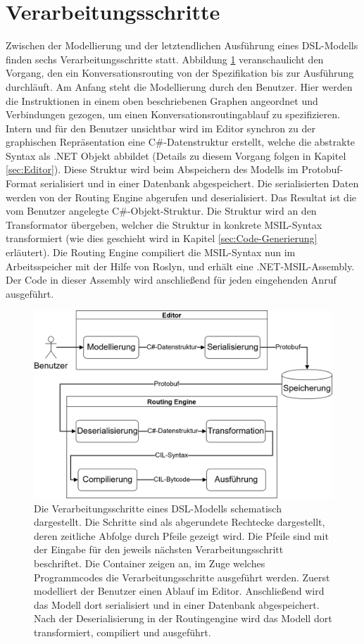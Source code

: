 \section{Verarbeitungsschritte}
\label{sec:Verarbeitungsschritte}
Zwischen der Modellierung und der letztendlichen Ausführung eines DSL-Modells finden sechs Verarbeitungsschritte statt. Abbildung \ref{fig:Verarbeitungsschritte} veranschaulicht den Vorgang, den ein Konversationsrouting von der Spezifikation bis zur Ausführung durchläuft. Am Anfang steht die Modellierung durch den Benutzer. Hier werden die Instruktionen in einem oben beschriebenen Graphen angeordnet und Verbindungen gezogen, um einen Konversationsroutingablauf zu spezifizieren. Intern und für den Benutzer unsichtbar wird im Editor synchron zu der graphischen Repräsentation eine C\#-Datenstruktur erstellt, welche die abstrakte Syntax als .NET Objekt abbildet (Details zu diesem Vorgang folgen in Kapitel \ref{sec:Editor}). Diese Struktur wird beim Abspeichern des Modells im Protobuf-Format serialisiert und in einer Datenbank abgespeichert. Die serialisierten Daten werden von der Routing Engine abgerufen und deserialisiert. Das Resultat ist die vom Benutzer angelegte C\#-Objekt-Struktur. Die Struktur wird an den Transformator übergeben, welcher die Struktur in konkrete MSIL-Syntax transformiert (wie dies geschieht wird in Kapitel \ref{sec:Code-Generierung} erläutert). Die Routing Engine compiliert die MSIL-Syntax nun im Arbeitsspeicher mit der Hilfe von Roslyn, und erhält eine .NET-MSIL-Assembly. Der Code in dieser Assembly wird anschließend für jeden eingehenden Anruf ausgeführt. 

\begin{figure} %
	\centering
		\includegraphics[width=\textwidth]{img/Verarbeitungsschritte.png}
	\caption[Verarbeitungsschritte eines DSL-Modells]{Die Verarbeitungsschritte eines DSL-Modells schematisch dargestellt. Die Schritte sind als abgerundete Rechtecke dargestellt, deren zeitliche Abfolge durch Pfeile gezeigt wird. Die Pfeile sind mit der Eingabe für den jeweils nächsten Verarbeitungsschritt beschriftet. Die Container zeigen an, im Zuge welches Programmcodes die Verarbeitungsschritte ausgeführt werden. Zuerst modelliert der Benutzer einen Ablauf im Editor. Anschließend wird das Modell dort serialisiert und in einer Datenbank abgespeichert. Nach der Deserialisierung in der Routingengine wird das Modell dort transformiert, compiliert und ausgeführt.}
	\label{fig:Verarbeitungsschritte}
\end{figure}